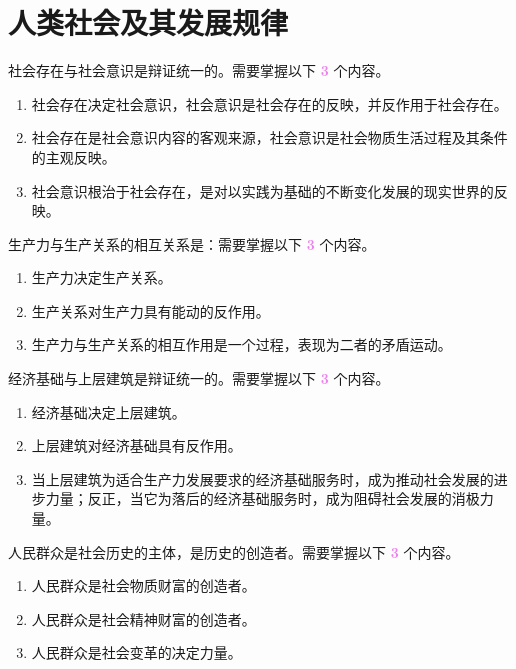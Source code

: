 \documentclass[UTF8]{ctexart}
\newcommand\Concept[1]{\colorbox{cyan!10!white}{\textcolor{cyan!40!black}{#1}}}
\newcommand\Emph[1]{\colorbox{violet!10}{\textcolor{violet}{\bfseries #1}}}
\newcommand\Example[1]{\textcolor{cyan!70!black}{\small #1}}
\newcommand\pos[1]{\hspace{0pt} \marginpar{\footnotesize\textcolor{yellow!50!black}{\hfill #1}}}
\begin{document}
\section{人类社会及其发展规律}
\begin{description}[itemsep=0pt]
    \item[\Concept{社会存在与社会意识}] \pos{p129} 社会存在与社会意识是辩证统一的。需要掌握以下 \Emph{3} 个内容。
    \Example{\begin{enumerate}[itemsep=0pt, parsep=0pt, leftmargin=15pt]
               \item 社会存在决定社会意识，社会意识是社会存在的反映，并反作用于社会存在。
               \item 社会存在是社会意识内容的客观来源，社会意识是社会物质生活过程及其条件的主观反映。
               \item 社会意识根治于社会存在，是对以实践为基础的不断变化发展的现实世界的反映。
             \end{enumerate}}

    \item[\Concept{生产力与生产关系}] \pos{p135} 生产力与生产关系的相互关系是：需要掌握以下 \Emph{3} 个内容。
    \Example{\begin{enumerate}[itemsep=0pt, parsep=0pt, leftmargin=15pt]
               \item 生产力决定生产关系。
               \item 生产关系对生产力具有能动的反作用。
               \item 生产力与生产关系的相互作用是一个过程，表现为二者的矛盾运动。
             \end{enumerate}}

    \item[\Concept{经济基础与上层建筑}] \pos{p139} 经济基础与上层建筑是辩证统一的。需要掌握以下 \Emph{3} 个内容。
    \Example{\begin{enumerate}[itemsep=0pt, parsep=0pt, leftmargin=15pt]
               \item 经济基础决定上层建筑。
               \item 上层建筑对经济基础具有反作用。
               \item 当上层建筑为适合生产力发展要求的经济基础服务时，成为推动社会发展的进步力量；反正，当它为落后的经济基础服务时，成为阻碍社会发展的消极力量。
             \end{enumerate}}

    \item[\Concept{人民群众创造历史}] \pos{p172} 人民群众是社会历史的主体，是历史的创造者。需要掌握以下 \Emph{3} 个内容。
    \Example{\begin{enumerate}[itemsep=0pt, parsep=0pt, leftmargin=15pt]
                \item 人民群众是社会物质财富的创造者。
                \item 人民群众是社会精神财富的创造者。
                \item 人民群众是社会变革的决定力量。
            \end{enumerate}}


\end{description}
\end{document}
